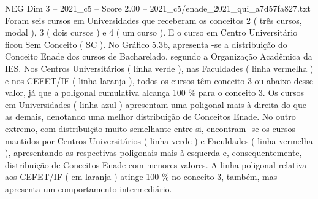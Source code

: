 \begin{textsample}{NEG Dim 3 – 2021\_c5 – Score 2.00 – 2021\_c5/enade\_2021\_qui\_a7d57fa827.txt}
Foram seis cursos em Universidades que receberam os conceitos 2 ( três cursos, modal ), 3 ( dois cursos ) e 4 ( um curso ).
E o curso em Centro Universitário ficou Sem Conceito ( SC ).
No Gráfico 5.3b, apresenta -se a distribuição do Conceito Enade dos cursos de Bacharelado, segundo a Organização Acadêmica da IES.
Nos Centros Universitários ( linha verde ), nas Faculdades ( linha vermelha ) e nos CEFET/IF ( linha laranja ), todos os cursos têm conceito 3 ou abaixo desse valor, já que a poligonal cumulativa alcança 100 \% para o conceito 3.
Os cursos em Universidades ( linha azul ) apresentam uma poligonal mais à direita do que as demais, denotando uma melhor distribuição de Conceitos Enade.
No outro extremo, com distribuição muito semelhante entre si, encontram -se os cursos mantidos por Centros Universitários ( linha verde ) e Faculdades ( linha vermelha ), apresentando as respectivas poligonais mais à esquerda e, consequentemente, distribuição de Conceitos Enade com menores valores.
A linha poligonal relativa aos CEFET/IF ( em laranja ) atinge 100 \% no conceito 3, também, mas apresenta um comportamento intermediário.

\end{textsample}
